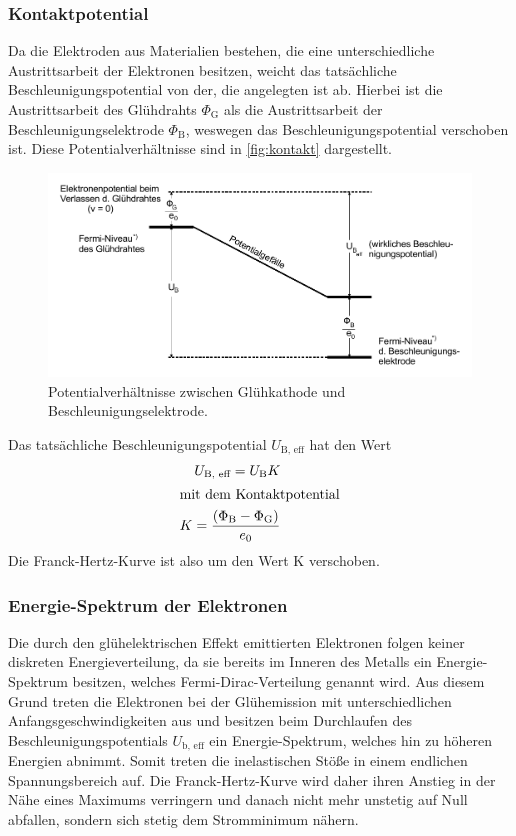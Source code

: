 \subsubsection{Kontaktpotential}

Da die Elektroden aus Materialien bestehen, die eine unterschiedliche Austrittsarbeit der Elektronen besitzen,
weicht das tatsächliche Beschleunigungspotential von der, die angelegten ist ab.
Hierbei ist die Austrittsarbeit des Glühdrahts $\Phi_\text{G}$ als die Austrittsarbeit der Beschleunigungselektrode $\Phi_\text{B}$,
weswegen das Beschleunigungspotential verschoben ist. Diese Potentialverhältnisse sind in \autoref{fig:kontakt} dargestellt.
\begin{figure}
    \centering
    \includegraphics[width=0.8\linewidth]{pictures/kontakt.pdf}
    \caption{Potentialverhältnisse zwischen Glühkathode und Beschleunigungselektrode. \cite{v601}}
    \label{fig:kontakt}
\end{figure}
Das tatsächliche Beschleunigungspotential $U_\text{B, eff}$ hat den Wert
\begin{align}
    U_\text{B, eff} = U_\text{B} K \\
    \intertext{mit dem Kontaktpotential}
    K = \frac{\left( \Phi_\text{B} - \Phi_\text{G} \right)}{e_0} \label{eq:Kontaktpotential}
\end{align}
Die Franck-Hertz-Kurve ist also um den Wert K verschoben.


\subsubsection{Energie-Spektrum der Elektronen}

Die durch den glühelektrischen Effekt emittierten Elektronen folgen keiner diskreten Energieverteilung,
da sie bereits im Inneren des Metalls ein Energie-Spektrum besitzen, welches Fermi-Dirac-Verteilung genannt wird.
Aus diesem Grund treten die Elektronen bei der Glühemission mit unterschiedlichen Anfangsgeschwindigkeiten aus
und besitzen beim Durchlaufen des Beschleunigungspotentials $U_\text{b, eff}$ ein Energie-Spektrum,
welches hin zu höheren Energien abnimmt.
Somit treten die inelastischen Stöße in einem endlichen Spannungsbereich auf.
Die Franck-Hertz-Kurve wird daher ihren Anstieg in der Nähe eines Maximums verringern 
und danach nicht mehr unstetig auf Null abfallen, sondern sich stetig dem Stromminimum nähern.



